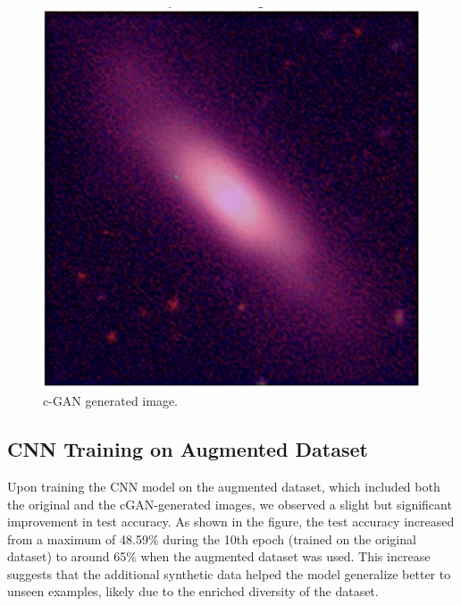 \documentclass[10pt,twocolumn,letterpaper]{article}
\begin{document}
\begin{figure}[htbp]
  \includegraphics[width=\linewidth]{gernerated_image.png}
  \caption{c-GAN generated image.}
  \label{fig:galaxysrgan}
\end{figure}


\subsection{CNN Training on Augmented Dataset}
Upon training the CNN model on the augmented dataset, which included both the original and the cGAN-generated images, we observed a slight but significant improvement in test accuracy. As shown in the figure, the test accuracy increased from a maximum of 48.59\% during the 10th epoch (trained on the original dataset) to around 65\% when the augmented dataset was used. This increase suggests that the additional synthetic data helped the model generalize better to unseen examples, likely due to the enriched diversity of the dataset.
\end{document}
